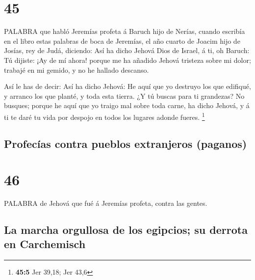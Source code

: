 \hypertarget{section-44}{%
\section{45}\label{section-44}}

 PALABRA que habló Jeremías profeta á Baruch hijo de Nerías,
cuando escribía en el libro estas palabras de boca de Jeremías, el año
cuarto de Joacim hijo de Josías, rey de Judá, diciendo:  Así
ha dicho Jehová Dios de Israel, á ti, oh Baruch:  Tú
dijiste: ¡Ay de mí ahora! porque me ha añadido Jehová tristeza sobre mi
dolor; trabajé en mi gemido, y no he hallado descanso.

 Así le has de decir: Así ha dicho Jehová: He aquí que yo
destruyo los que edifiqué, y arranco los que planté, y toda esta tierra.
 ¿Y tú buscas para ti grandezas? No busques; porque he aquí
que yo traigo mal sobre toda carne, ha dicho Jehová, y á ti te daré tu
vida por despojo en todos los lugares adonde fueres. \footnote{\textbf{45:5}
  Jer 39,18; Jer 43,6}

\hypertarget{profecuxedas-contra-pueblos-extranjeros-paganos}{%
\subsection{Profecías contra pueblos extranjeros
(paganos)}\label{profecuxedas-contra-pueblos-extranjeros-paganos}}

\hypertarget{section-45}{%
\section{46}\label{section-45}}

 PALABRA de Jehová que fué á Jeremías profeta, contra las
gentes.

\hypertarget{la-marcha-orgullosa-de-los-egipcios-su-derrota-en-carchemisch}{%
\subsection{La marcha orgullosa de los egipcios; su derrota en
Carchemisch}\label{la-marcha-orgullosa-de-los-egipcios-su-derrota-en-carchemisch}}

